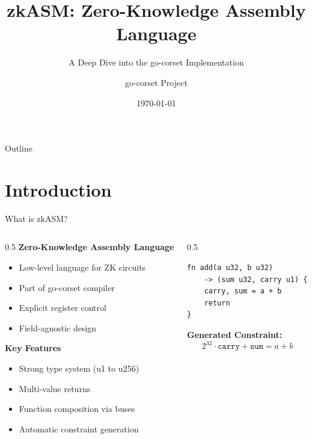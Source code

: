 \documentclass[aspectratio=169,11pt]{beamer}
\title[zkASM]{zkASM: Zero-Knowledge Assembly Language}
\subtitle{A Deep Dive into the go-corset Implementation}
\author{go-corset Project}
\date{\today}
\institute{Consensys}
\begin{document}
\begin{frame}
\titlepage
\end{frame}

\begin{frame}{Outline}
\tableofcontents
\end{frame}

\section{Introduction}

\begin{frame}[fragile]{What is zkASM?}
\begin{columns}
\begin{column}{0.5\textwidth}
\textbf{Zero-Knowledge Assembly Language}
\begin{itemize}
    \item Low-level language for ZK circuits
    \item Part of go-corset compiler
    \item Explicit register control
    \item Field-agnostic design
\end{itemize}

\vspace{1em}
\textbf{Key Features}
\begin{itemize}
    \item Strong type system (u1 to u256)
    \item Multi-value returns
    \item Function composition via buses
    \item Automatic constraint generation
\end{itemize}
\end{column}

\begin{column}{0.5\textwidth}
\begin{lstlisting}[style=zkasm]
fn add(a u32, b u32)
    -> (sum u32, carry u1) {
    carry, sum = a + b
    return
}
\end{lstlisting}

\vspace{1em}
\textbf{Generated Constraint:}
\[
2^{32} \cdot \texttt{carry} + \texttt{sum} = a + b
\]
\end{column}
\end{columns}
\end{frame}
\end{document}
